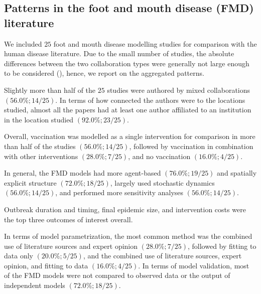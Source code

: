 \documentclass[10pt,letterpaper]{article}
\begin{document}
\subsection*{Patterns in the foot and mouth disease (FMD) literature}
We included $25$ foot and mouth disease modelling studies for comparison with the human disease literature. Due to the small number of studies, the absolute differences between the two collaboration types were generally not large enough to be considered (), hence, we report on the aggregated patterns. 

Slightly more than half of the $25$ studies were authored by mixed collaborations $(56.0\%; 14/25)$. In terms of how connected the authors were to the locations studied, almost all the papers had at least one author affiliated to an institution in the location studied $(92.0\%; 23/25)$. 

Overall, vaccination was modelled as a single intervention for comparison in more than half of the studies $(56.0\%; 14/25)$, followed by vaccination in combination with other interventions $(28.0\%; 7/25)$, and no vaccination $(16.0\%; 4/25)$.  


In general, the FMD models had more agent-based $(76.0\%; 19/25)$ and spatially explicit structure $(72.0\%; 18/25)$, largely used stochastic dynamics $(56.0\%; 14/25)$, and performed more sensitivity analyses $(56.0\%; 14/25)$. 

Outbreak duration and timing, final epidemic size, and intervention costs were the top three outcomes of interest overall. 


In terms of model parametrization, the most common method was the combined use of literature sources and expert opinion $(28.0\%; 7/25)$, followed by fitting to data only $(20.0\%; 5/25)$, and the combined use of literature sources, expert opinion, and fitting to data $(16.0\%; 4/25)$. In terms of model validation, most of the FMD models were not compared to observed data or the output of independent models $(72.0\%; 18/25)$. 
\end{document}
